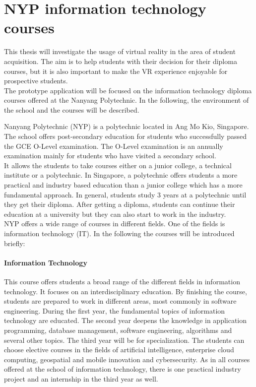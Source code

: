 \section{NYP information technology courses}
This thesis will investigate the usage of virtual reality in the area of student acquisition. The aim is to help students with their decision for their diploma courses, but it is also important to make the VR experience enjoyable for prospective students.\\
The prototype application will be focused on the information technology diploma courses offered at the Nanyang Polytechnic. In the following, the environment of the school and the courses will be described.

Nanyang Polytechnic (NYP) is a polytechnic located in Ang Mo Kio, Singapore. The school offers post-secondary education for students who successfully passed the GCE O-Level examination. The O-Level examination is an annually examination mainly for students who have visited a secondary school. \cite{aboutOLevel} \\ 
It allows the students to take courses either on a junior college, a technical institute or a polytechnic. In Singapore, a polytechnic offers students a more practical and industry based education than a junior college which has a more fundamental approach. In general, students study 3 years at a polytechnic until they get their diploma. After getting a diploma, students can continue their education at a university but they can also start to work in the industry. \cite{schoolSystem}\\
NYP offers a wide range of courses in different fields. One of the fields is information technology (IT). In the following the courses will be introduced briefly: \cite{nypCourses}

\paragraph{Information Technology}
This course offers students a broad range of the different fields in information technology. It focuses on an interdisciplinary education. By finishing the course, students are prepared to work in different areas, most commonly in software engineering. During the first year, the fundamental topics of information technology are educated. The second year deepens the knowledge in application programming, database management, software engineering, algorithms and several other topics. The third year will be for specialization. The students can choose elective courses in the fields of artificial intelligence, enterprise cloud computing, geospatial and mobile innovation and cybersecurity. As in all courses offered at the school of information technology, there is one practical industry project and an internship in the third year as well.

